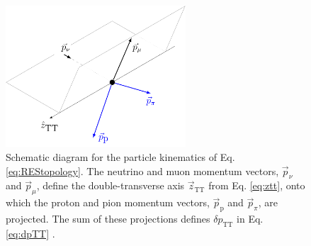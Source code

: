 \begin{figure}[t]
     \centering

         \includegraphics[width=0.6\textwidth]{figures/ch6-TKI/source_dpttdef_wScreen.pdf}
        \caption{Schematic diagram for the particle kinematics of Eq. \ref{eq:REStopology}. The neutrino and muon momentum vectors, $\Vec{p}_\nu$ and $\Vec{p}_\mu$, define the double-transverse axis $\Vec{z}_\text{TT}$ from Eq. \ref{eq:ztt}, onto which the proton and pion momentum vectors, $\Vec{p}_\text{p}$ and $\Vec{p}_\pi$, are projected. The sum of these projections defines $\delta p_\text{TT}$ in Eq. \ref{eq:dpTT} \cite{Lu}. } \label{fig:source_dpttdef_wScreen.pdf}
\end{figure}

